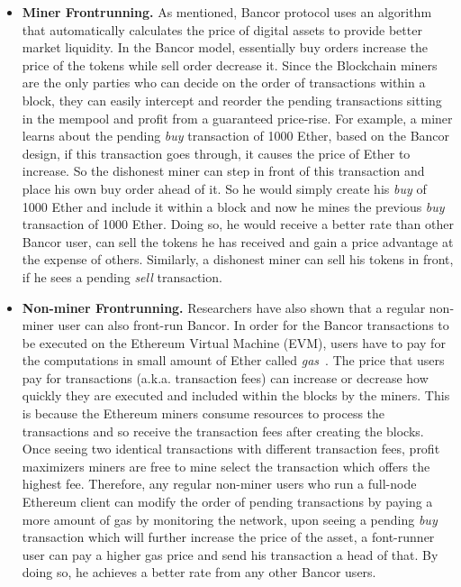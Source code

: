 \begin{itemize}
\item {\textbf{Miner Frontrunning.}} As mentioned, Bancor protocol uses an algorithm that automatically calculates the price of digital assets to provide better market liquidity. In the Bancor model, essentially buy orders increase the price of the tokens while sell order decrease it. Since the Blockchain miners are the only parties who can decide on the order of transactions within a block, they can easily intercept and reorder the pending transactions sitting in the mempool and profit from a guaranteed price-rise. For example, a miner learns about the pending \textit{buy} transaction of 1000 Ether, based on the Bancor design, if this transaction goes through, it causes the price of Ether to increase. So the dishonest miner can step in front of this transaction and  place his own buy order ahead of it. So he would simply create his \textit{buy} of 1000 Ether and include it within a block and now he mines the previous \textit{buy} transaction of 1000 Ether. Doing so, he would receive a better rate than other Bancor user, can sell the tokens he has received and gain a price advantage at the expense of others. Similarly, a dishonest miner can sell his tokens in front, if he sees a pending \textit{sell} transaction.


\item {\textbf{Non-miner Frontrunning.}} Researchers have also shown that a regular non-miner user can also front-run Bancor. In order for the Bancor transactions to be executed on the Ethereum Virtual Machine (EVM),  users have to pay for the computations in small amount of Ether called \textit{gas}~\cite{AccountT67:online}. The price that users pay for transactions (a.k.a. transaction fees) can increase or decrease how quickly they are executed and included within the blocks by the miners.  This is because the Ethereum miners consume resources to process the transactions and so receive the transaction fees after creating the blocks. Once seeing two identical transactions with different transaction fees, profit maximizers miners are free to mine select the transaction which offers the highest fee. Therefore, any regular non-miner users who run a full-node Ethereum client can modify the order of pending transactions by paying a more amount of gas \ie by monitoring the network, upon seeing a  pending \textit{buy} transaction which will further increase the price of the asset, a font-runner user can pay a higher gas price and send his transaction a head of that. By doing so, he achieves a better rate from any other Bancor users.

\end{itemize}

